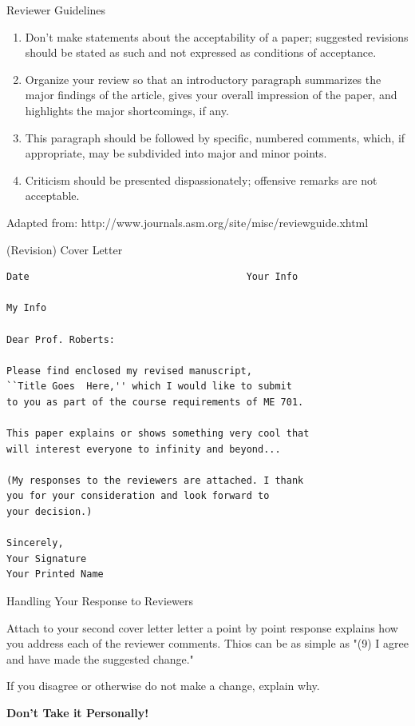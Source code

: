 \documentclass[10pt,handout]{beamer}
\begin{document}
\begin{frame}{Reviewer Guidelines}


\begin{enumerate}
 \item Don't make statements about the acceptability of a paper;
suggested revisions should be stated as such and not expressed as
conditions of acceptance.
 \item Organize your review so that an introductory paragraph summarizes
the major findings of the article, gives your overall impression of the
paper, and highlights the major shortcomings, if any.
 \item This paragraph should be followed by specific, numbered
comments, which, if appropriate, may be subdivided into major and
minor points.
 \item Criticism should be presented dispassionately; offensive remarks are
not acceptable.
\end{enumerate}
\vfill 

Adapted from:  http://www.journals.asm.org/site/misc/reviewguide.xhtml
\end{frame}

\begin{frame}[fragile]{(Revision) Cover Letter}

\begin{verbatim}
Date                                      Your Info

My Info

Dear Prof. Roberts:

Please find enclosed my revised manuscript,
``Title Goes  Here,'' which I would like to submit 
to you as part of the course requirements of ME 701.

This paper explains or shows something very cool that
will interest everyone to infinity and beyond...

(My responses to the reviewers are attached. I thank 
you for your consideration and look forward to 
your decision.)

Sincerely,
Your Signature
Your Printed Name
\end{verbatim}

\end{frame}

\begin{frame}[fragile]{Handling Your Response to Reviewers}

Attach to your second cover letter letter a
 point by point response
explains how you address each of the
reviewer comments. Thios can be as simple as
"(9) I agree and have made the suggested
change."

\vfill 

If you disagree or otherwise do not make a
change, explain why.

\vfill 

\pause
{\large  
{\bf Don't Take it Personally!}
}  


\end{frame}
\end{document}

